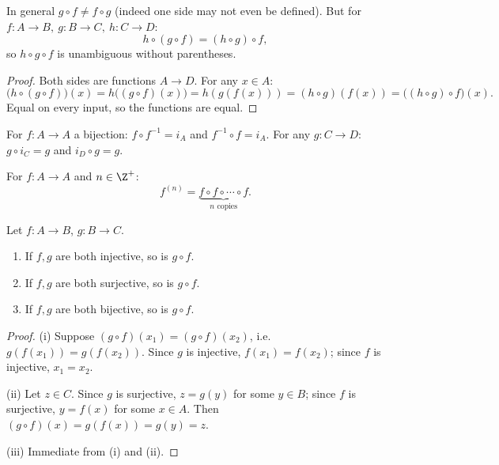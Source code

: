 \begin{proposition}
In general $g \circ f \neq f \circ g$ (indeed one side may not even be defined). But for $f: A\to B,\ g: B\to C,\ h: C\to D$:
\[
h \circ (g \circ f) = (h \circ g) \circ f,
\]
so $h \circ g \circ f$ is unambiguous without parentheses.
\end{proposition}
\begin{proof}
Both sides are functions $A \to D$. For any $x \in A$:
\[
\big(h \circ (g \circ f)\big)(x) = h\big((g\circ f)(x)\big) = h(g(f(x))) = (h \circ g)(f(x)) = \big((h \circ g) \circ f\big)(x).
\]
Equal on every input, so the functions are equal.
\end{proof}

\begin{proposition}
For $f: A \to A$ a bijection: $f \circ f^{-1} = i_A$ and $f^{-1} \circ f = i_A$. For any $g: C \to D$: $g \circ i_C = g$ and $i_D \circ g = g$.
\end{proposition}

\begin{definition}
For $f: A \to A$ and $n \in \Z^+$:
\[
f^{(n)} = \underbrace{f \circ f \circ \cdots \circ f}_{n \text{ copies}}.
\]
\end{definition}

\begin{proposition}
Let $f: A \to B$, $g: B \to C$.
\begin{enumerate}[label=(\roman*)]
    \item If $f,g$ are both injective, so is $g \circ f$.
    \item If $f,g$ are both surjective, so is $g \circ f$.
    \item If $f,g$ are both bijective, so is $g \circ f$.
\end{enumerate}
\end{proposition}
\begin{proof}
(i) Suppose $(g\circ f)(x_1) = (g\circ f)(x_2)$, i.e.\ $g(f(x_1)) = g(f(x_2))$. Since $g$ is injective, $f(x_1) = f(x_2)$; since $f$ is injective, $x_1 = x_2$.

(ii) Let $z \in C$. Since $g$ is surjective, $z = g(y)$ for some $y \in B$; since $f$ is surjective, $y = f(x)$ for some $x \in A$. Then $(g\circ f)(x) = g(f(x)) = g(y) = z$.

(iii) Immediate from (i) and (ii).
\end{proof}

